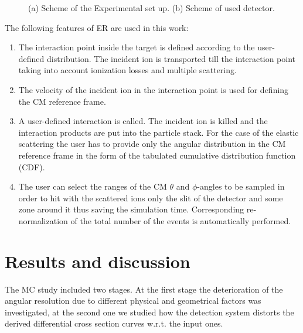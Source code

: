 \documentclass[%
 aip,
cp,  %
 amsmath,amssymb,%
 reprint,%
]{revtex4-2}
\begin{document}
\begin{figure}[h!]
\begin{minipage}[h]{0.45\linewidth}
\end{minipage}
\hfill
\begin{minipage}[h]{0.45\linewidth}
\end{minipage}
\vspace{0.05cm}
\caption{(a) Scheme of the Experimental set up. (b) Scheme of used detector. }
\label{ris:fig1}
\end{figure}

The following features of ER are used in this work:
\begin{enumerate}
\item The interaction point inside the target is defined according to the user-defined distribution. The incident ion is transported till the interaction point taking into account ionization losses and multiple scattering.
\item The velocity of the incident ion in the interaction point is used for defining the CM reference frame.
\item A user-defined interaction is called. The incident ion is killed and the interaction products are put into the particle stack. For the case of the elastic scattering the user has to provide only the angular distribution in the CM reference frame in the form of the tabulated cumulative distribution function (CDF).
\item The user can select the ranges of the CM $\theta$ and $\phi$-angles to be sampled in order to hit with the scattered ions only the slit of the detector and some zone around it thus saving the simulation time.  Corresponding re-normalization of the total number of the events is automatically performed.
\end{enumerate}

\section{Results and discussion}

The MC study included two stages. At the first stage the deterioration of the angular resolution due to different physical and geometrical factors  was investigated, at the second one we studied how the detection system distorts the derived differential cross section curves w.r.t. the input ones.
\end{document}
